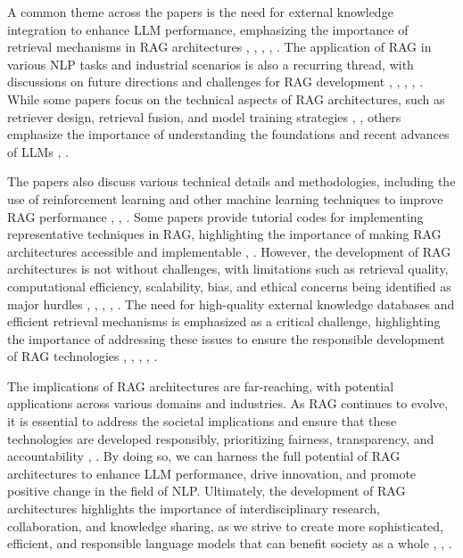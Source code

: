 \documentclass[conference]{IEEEtran}
\begin{document}
A common theme across the papers is the need for external knowledge integration to enhance LLM performance, emphasizing the importance of retrieval mechanisms in RAG architectures \cite{b1}, \cite{b2}, \cite{b3}, \cite{b4}, \cite{b5}. The application of RAG in various NLP tasks and industrial scenarios is also a recurring thread, with discussions on future directions and challenges for RAG development \cite{b1}, \cite{b2}, \cite{b3}, \cite{b4}, \cite{b5}. While some papers focus on the technical aspects of RAG architectures, such as retriever design, retrieval fusion, and model training strategies \cite{b2}, \cite{b4}, others emphasize the importance of understanding the foundations and recent advances of LLMs \cite{b1}, \cite{b3}.

The papers also discuss various technical details and methodologies, including the use of reinforcement learning and other machine learning techniques to improve RAG performance \cite{b1}, \cite{b2}, \cite{b3}. Some papers provide tutorial codes for implementing representative techniques in RAG, highlighting the importance of making RAG architectures accessible and implementable \cite{b3}, \cite{b5}. However, the development of RAG architectures is not without challenges, with limitations such as retrieval quality, computational efficiency, scalability, bias, and ethical concerns being identified as major hurdles \cite{b1}, \cite{b2}, \cite{b3}, \cite{b4}, \cite{b5}. The need for high-quality external knowledge databases and efficient retrieval mechanisms is emphasized as a critical challenge, highlighting the importance of addressing these issues to ensure the responsible development of RAG technologies \cite{b1}, \cite{b2}, \cite{b3}, \cite{b4}, \cite{b5}.

The implications of RAG architectures are far-reaching, with potential applications across various domains and industries. As RAG continues to evolve, it is essential to address the societal implications and ensure that these technologies are developed responsibly, prioritizing fairness, transparency, and accountability \cite{b2}, \cite{b4}. By doing so, we can harness the full potential of RAG architectures to enhance LLM performance, drive innovation, and promote positive change in the field of NLP. Ultimately, the development of RAG architectures highlights the importance of interdisciplinary research, collaboration, and knowledge sharing, as we strive to create more sophisticated, efficient, and responsible language models that can benefit society as a whole \cite{b1}, \cite{b3}, \cite{b5}.
\end{document}

